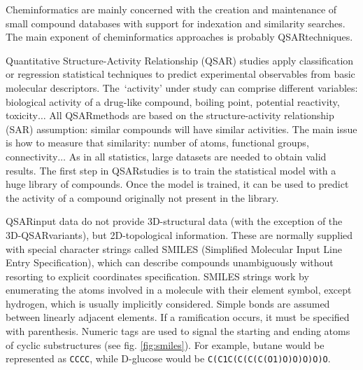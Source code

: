 Cheminformatics are mainly concerned with the creation and maintenance of small compound databases with support for indexation and similarity searches. The main exponent of cheminformatics approaches is probably QSARtechniques.

Quantitative Structure-Activity Relationship (Q\/SAR) studies apply classification or regression statistical techniques to predict experimental observables from basic molecular descriptors. The\ ‘activity’ under study can comprise different variables: biological activity of a drug-like compound, boiling point, potential reactivity, toxicity$ \ldots $  All QSARmethods are based on the structure-activity relationship (SAR) assumption: similar compounds will have similar activities. The main issue is how to measure that similarity: number of atoms, functional groups, connectivity$ \ldots $   As in all statistics, large datasets are needed to obtain valid results. The first step in QSARstudies is to train the statistical model with a huge library of compounds. Once the model is trained, it can be used to predict the activity of a compound originally not present in the library.

QSARinput data do not provide 3D-structural data (with the exception of the 3D-QSARvariants), but 2D-topological information. These are normally supplied with special character strings called SMILES (Simplified Molecular Input Line Entry Specification),\cite{smiles} which can describe compounds unambiguously without resorting to explicit coordinates specification. SMILES strings work by enumerating the atoms involved in a molecule with their element symbol, except hydrogen, which is usually implicitly considered. Simple bonds are assumed between linearly adjacent elements. If a ramification occurs, it must be specified with parenthesis. Numeric tags are used to signal the starting and ending atoms of cyclic substructures (see fig. \ref{fig:smiles}). For example, butane would be represented as \texttt{CCCC}, while D-glucose would be \texttt{C(C1C(C(C(C(O1)O)O)O)O)O}.


